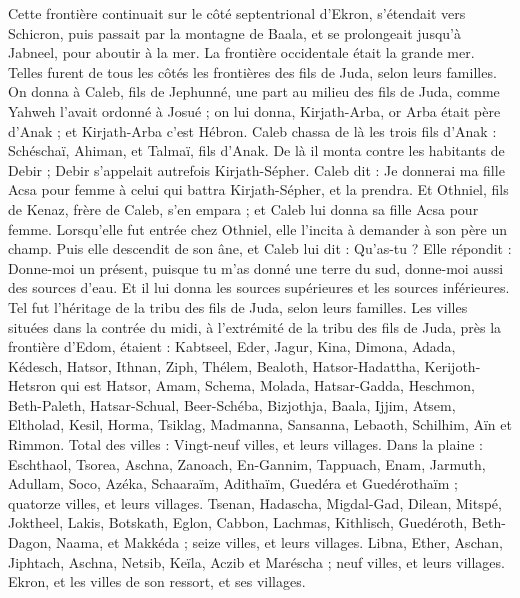 \begin{multicols}{2}
Cette frontière continuait sur le côté septentrional d’Ekron, s’étendait vers Schicron, puis passait par la montagne de Baala, et se prolongeait jusqu’à Jabneel, pour aboutir à la mer.
La frontière occidentale était la grande mer. Telles furent de tous les côtés les frontières des fils de Juda, selon leurs familles.
On donna à Caleb, fils de Jephunné, une part au milieu des fils de Juda, comme Yahweh l’avait ordonné à Josué ; on lui donna, Kirjath-Arba, or Arba était père d’Anak ; et Kirjath-Arba c’est Hébron.
Caleb chassa de là les trois fils d’Anak : Schéschaï, Ahiman, et Talmaï, fils d’Anak.
De là il monta contre les habitants de Debir ; Debir s’appelait autrefois Kirjath-Sépher.
Caleb dit : Je donnerai ma fille Acsa pour femme à celui qui battra Kirjath-Sépher, et la prendra.
Et Othniel, fils de Kenaz, frère de Caleb, s’en empara ; et Caleb lui donna sa fille Acsa pour femme.
Lorsqu’elle fut entrée chez Othniel, elle l’incita à demander à son père un champ. Puis elle descendit de son âne, et Caleb lui dit : Qu’as-tu ?
Elle répondit : Donne-moi un présent, puisque tu m’as donné une terre du sud, donne-moi aussi des sources d’eau. Et il lui donna les sources supérieures et les sources inférieures.
Tel fut l’héritage de la tribu des fils de Juda, selon leurs familles.
Les villes situées dans la contrée du midi, à l’extrémité de la tribu des fils de Juda, près la frontière d’Edom, étaient : Kabtseel, Eder, Jagur,
Kina, Dimona, Adada,
Kédesch, Hatsor, Ithnan,
Ziph, Thélem, Bealoth,
Hatsor-Hadattha, Kerijoth-Hetsron qui est Hatsor,
Amam, Schema, Molada,
Hatsar-Gadda, Heschmon, Beth-Paleth,
Hatsar-Schual, Beer-Schéba, Bizjothja,
Baala, Ijjim, Atsem,
Eltholad, Kesil, Horma,
Tsiklag, Madmanna, Sansanna,
Lebaoth, Schilhim, Aïn et Rimmon. Total des villes : Vingt-neuf villes, et leurs villages.
Dans la plaine : Eschthaol, Tsorea, Aschna,
Zanoach, En-Gannim, Tappuach, Enam,
Jarmuth, Adullam, Soco, Azéka,
Schaaraïm, Adithaïm, Guedéra et Guedérothaïm ; quatorze villes, et leurs villages.
Tsenan, Hadascha, Migdal-Gad,
Dilean, Mitspé, Joktheel,
Lakis, Botskath, Eglon,
Cabbon, Lachmas, Kithlisch,
Guedéroth, Beth-Dagon, Naama, et Makkéda ; seize villes, et leurs villages.
Libna, Ether, Aschan,
Jiphtach, Aschna, Netsib,
Keïla, Aczib et Maréscha ; neuf villes, et leurs villages.
Ekron, et les villes de son ressort, et ses villages.

\end{multicols}
